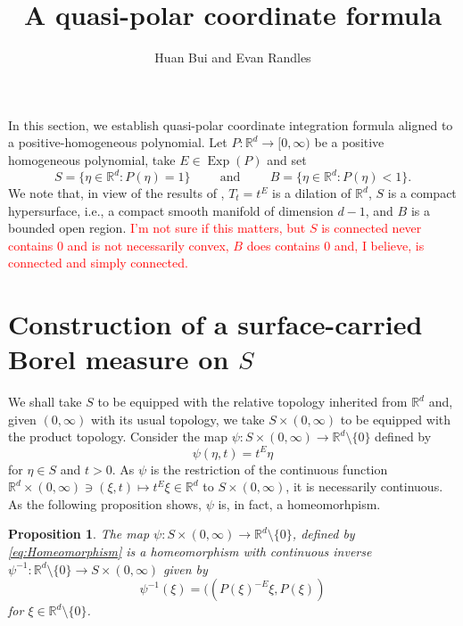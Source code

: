 \documentclass[11pt]{article}
\author{Huan Bui and Evan Randles}
\title{A quasi-polar coordinate formula}
\date{}
\theoremstyle{theorem}
\newtheorem{proposition}[theorem]{Proposition}
\newcommand\Exp{\operatorname{Exp}}
\begin{document}
\maketitle

In this section, we establish quasi-polar coordinate integration formula aligned to a positive-homogeneous polynomial. Let $P:\mathbb{R}^d\to [0,\infty)$ be a positive homogeneous polynomial, take $E\in\Exp(P)$ and set
\begin{equation*}
S=\{\eta\in\mathbb{R}^d: P(\eta)=1\}\hspace{1cm}\mbox{and}\hspace{1cm}B=\{\eta\in\mathbb{R}^d:P(\eta)<1\}.
\end{equation*}
We note that, in view of the results of \cite{Randles2017}, $T_t=t^E$ is a dilation of $\mathbb{R}^d$, $S$ is a compact hypersurface, i.e., a compact smooth manifold of dimension $d-1$, and $B$ is a bounded open region. \textcolor{red}{I'm not sure if this matters, but $S$ is connected never contains $0$ and is not necessarily convex, $B$ does contains $0$ and, I believe, is connected and simply connected.} 

\section{Construction of a surface-carried Borel measure on $S$}

We shall take $S$ to be equipped with the relative topology inherited from $\mathbb{R}^d$ and, given $(0,\infty)$ with its usual topology, we take $S\times (0,\infty)$ to be equipped with the product topology. Consider the map $\psi:S\times (0,\infty)\to\mathbb{R}^d\setminus\{0\}$ defined by
\begin{equation}\label{eq:Homeomorphism}
\psi(\eta,t)=t^E\eta
\end{equation}
for $\eta\in S$ and $t>0$. As $\psi$ is the restriction of the continuous function $\mathbb{R}^d\times (0,\infty)\ni (\xi,t)\mapsto t^E\xi\in\mathbb{R}^d$ to $S\times (0,\infty)$, it is necessarily continuous. As the following proposition shows, $\psi$ is, in fact, a homeomorhpism.

\begin{proposition}\label{prop:PsiHomeomorphism}
The map $\psi:S\times (0,\infty)\to\mathbb{R}^d\setminus\{0\}$, defined by \eqref{eq:Homeomorphism} is a homeomorphism with continuous inverse $\psi^{-1}:\mathbb{R}^d\setminus\{0\}\to S\times (0,\infty)$ given by
\begin{equation*}
\psi^{-1}(\xi)=((P(\xi)^{-E}\xi,P(\xi))
\end{equation*}
for $\xi\in\mathbb{R}^d\setminus\{0\}$.
\end{proposition}
\end{document}
